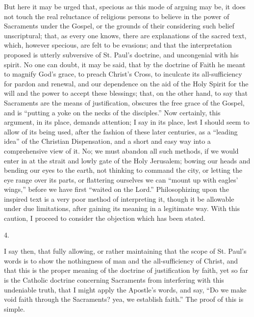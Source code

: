 But here it may be urged that, specious as this mode of arguing may
be, it does not touch the real reluctance of religious persons to
believe in the power of Sacraments under the Gospel, or the grounds of
their considering such belief unscriptural; that, as every one knows,
there are explanations of the sacred text, which, however specious,
are felt to be evasions; and that the interpretation proposed is
utterly subversive of St. Paul's doctrine, and uncongenial with his
spirit. No one can doubt, it may be said, that by the doctrine of
Faith he meant to magnify God's grace, to preach Christ's Cross, to
inculcate its all-sufficiency for pardon and renewal, and our
dependence on the aid of the Holy Spirit for the will and the power to
accept these blessings; that, on the other hand, to say that
Sacraments are the means of justification, obscures the free
grace of the Gospel, and is ``putting a yoke on the necks of the
disciples.'' Now certainly, this argument, in its place, demands
attention; I say in its place, lest I should seem to allow of its
being used, after the fashion of these later centuries, as a
``leading idea'' of the Christian Dispensation, and a short
and easy way into a comprehensive view of it. No; we must abandon all
such methods, if we would enter in at the strait and lowly gate of the
Holy Jerusalem; bowing our heads and bending our eyes to the earth,
not thinking to command the city, or letting the eye range over its
parts, or flattering ourselves we can ``mount up with eagles'
wings,'' before we have first ``waited on the Lord.''
Philosophizing upon the inspired text is a very poor method of
interpreting it, though it be allowable under due limitations, after
gaining its meaning in a legitimate way. With this caution, I proceed
to consider the objection which has been stated.

4.

I say then, that fully allowing, or rather maintaining that the
scope of St. Paul's words is to show the nothingness of man and the
all-sufficiency of Christ, and that this is the proper meaning of the
doctrine of justification by faith, yet so far is the Catholic
doctrine concerning Sacraments from interfering with this undeniable
truth, that I might apply the Apostle's words, and say, ``Do we
make void faith through the Sacraments? yea, we establish faith.''
The proof of this is simple.

